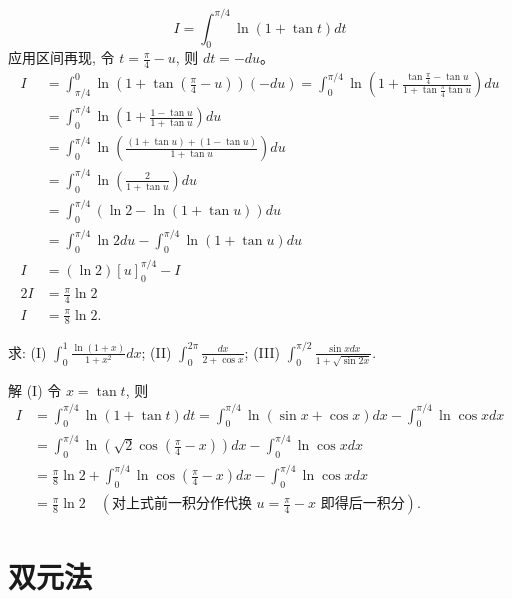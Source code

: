 \documentclass[lang=cn,newtx,10pt,scheme=chinese]{elegantbook}
\renewcommand{\textbf}[1]{\text{\heiti #1}}
\begin{document}
\begin{solution}
$$$$
\textbf{方法二：(直接区间再现)}
$$
I = \int_0^{\pi/4} \ln(1 + \tan t) dt
$$
应用区间再现, 令 $t = \frac{\pi}{4} - u$, 则 $dt = -du$。
$$
\begin{aligned}
I &= \int_{\pi/4}^0 \ln\left(1 + \tan\left(\frac{\pi}{4} - u\right)\right) (-du) = \int_0^{\pi/4} \ln\left(1 + \frac{\tan\frac{\pi}{4} - \tan u}{1 + \tan\frac{\pi}{4} \tan u}\right) du \\
&= \int_0^{\pi/4} \ln\left(1 + \frac{1 - \tan u}{1 + \tan u}\right) du \\
&= \int_0^{\pi/4} \ln\left(\frac{(1 + \tan u) + (1 - \tan u)}{1 + \tan u}\right) du \\
&= \int_0^{\pi/4} \ln\left(\frac{2}{1 + \tan u}\right) du \\
&= \int_0^{\pi/4} (\ln 2 - \ln(1 + \tan u)) du \\
&= \int_0^{\pi/4} \ln 2 du - \int_0^{\pi/4} \ln(1 + \tan u) du \\
I &= (\ln 2) [u]_0^{\pi/4} - I \\
2I &= \frac{\pi}{4} \ln 2 \\
I &= \frac{\pi}{8} \ln 2.
\end{aligned}
$$
\end{solution}
    \begin{example}
  求: (I) $\int_0^1 \frac{\ln(1 + x)}{1 + x^2} dx$; (II) $\int_0^{2\pi} \frac{dx}{2 + \cos x}$; (III) $\int_0^{\pi/2} \frac{\sin x dx}{1 + \sqrt{\sin 2x}}$.
\end{example}
\begin{solution}
  解 (I) 令 $x = \tan t$, 则
  $$
  \begin{aligned}
  I &= \int_0^{\pi/4} \ln(1 + \tan t) dt = \int_0^{\pi/4} \ln(\sin x + \cos x) dx - \int_0^{\pi/4} \ln \cos x dx \\
  &= \int_0^{\pi/4} \ln\left(\sqrt{2} \cos\left(\frac{\pi}{4} - x\right)\right) dx - \int_0^{\pi/4} \ln \cos x dx \\
  &= \frac{\pi}{8} \ln 2 + \int_0^{\pi/4} \ln \cos\left(\frac{\pi}{4} - x\right) dx - \int_0^{\pi/4} \ln \cos x dx \\
  &= \frac{\pi}{8} \ln 2 \quad (\text{对上式前一积分作代换 } u = \frac{\pi}{4} - x \text{ 即得后一积分}).
  \end{aligned}
  $$
\end{solution}
    

\chapter{双元法}
\end{document}
